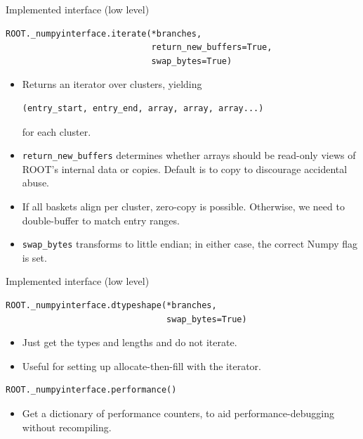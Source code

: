 \documentclass{beamer}
\begin{document}
\begin{frame}[fragile]{Implemented interface (low level)}
\vspace{0.5 cm}

\small
\begin{verbatim}
ROOT._numpyinterface.iterate(*branches,
                             return_new_buffers=True,
                             swap_bytes=True)
\end{verbatim}
\normalsize

\begin{itemize}
\item<1-> Returns an iterator over clusters, yielding
\small
\begin{verbatim}
(entry_start, entry_end, array, array, array...)
\end{verbatim}
\normalsize for each cluster.

\item<2-> {\tt\small return\_new\_buffers} determines whether arrays should be read-only views of ROOT's internal data or copies. Default is to copy to discourage accidental abuse.

\item<3-> If all baskets align per cluster, zero-copy is possible. Otherwise, we need to double-buffer to match entry ranges.

\item<4-> {\tt\small swap\_bytes} transforms to little endian; in either case, the correct Numpy flag is set.
\end{itemize}
\end{frame}

\begin{frame}[fragile]{Implemented interface (low level)}
\vspace{0.5 cm}
\small
\begin{verbatim}
ROOT._numpyinterface.dtypeshape(*branches,
                                swap_bytes=True)
\end{verbatim}
\normalsize

\begin{itemize}
\item Just get the types and lengths and do not iterate.

\item Useful for setting up allocate-then-fill with the iterator.
\end{itemize}

\vspace{0.75 cm}
\small
\begin{verbatim}
ROOT._numpyinterface.performance()
\end{verbatim}
\normalsize

\begin{itemize}
\item Get a dictionary of performance counters, to aid performance-debugging without recompiling.
\end{itemize}
\end{frame}
\end{document}
